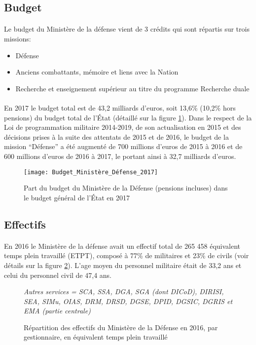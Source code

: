 \documentclass[11pt, book, english, french]{upmethodology-document}
\begin{document}
			\subsection{Budget}
				\paragraph*{}
					Le budget du Ministère de la défense vient de 3 crédits qui sont répartis sur trois missions:
					\begin{itemize}
						\item Défense
						\item Anciens combattants, mémoire et liens avec la Nation
						\item Recherche et enseignement supérieur au titre du programme Recherche duale
					\end{itemize}
				\paragraph*{}
					En 2017 le budget total est de 43,2 milliards d'euros, soit 13,6\% (10,2\% hors pensions) du budget total de l'État (détaillé sur la figure \ref{fig:Budget_Ministère_Défense_2017}). Dans le respect de la Loi de programmation militaire 2014-2019, de son actualisation en 2015 et des décisions prises à la suite des attentats de 2015 et de 2016, le budget de la mission ``Défense'' a été augmenté de 700 millions d'euros de 2015 à 2016 et de 600 millions d'euros de 2016 à 2017, le portant ainsi à 32,7 milliards d'euros.
				\begin{figure}[H]
					\centering%
					\texttt{[image: Budget\_Ministère\_Défense\_2017]}
					\caption{Part du budget du Ministère de la Défense (pensions incluses) dans le budget général de l’État en 2017\cite{ChiffresDef2017}}%
					\label{fig:Budget_Ministère_Défense_2017}%
				\end{figure}
			\subsection{Effectifs}
				\paragraph*{}
					En 2016 le Ministère de la défense avait un effectif total de 265 458 équivalent temps plein travaillé (ETPT), composé à 77\% de militaires et 23\% de civils (voir détails sur la figure \ref{fig:Effectifs_Ministère_Défense_2016}). L'age moyen du personnel militaire était de 33,2 ans et celui du personnel civil de 47,4 ans.
				\begin{figure}[H]
					\centering%
					\caption*{\small\itshape Autres services = SCA, SSA, DGA, SGA (dont DICoD), DIRISI, SEA, SIMu, OIAS, DRM, DRSD, DGSE, DPID, DGSIC, DGRIS et EMA (partie centrale)}%
					\caption{Répartition des effectifs du Ministère de la Défense en 2016, par gestionnaire, en équivalent temps plein travaillé\cite{ChiffresDef2017}}%
					\label{fig:Effectifs_Ministère_Défense_2016}%
				\end{figure}
\end{document}
